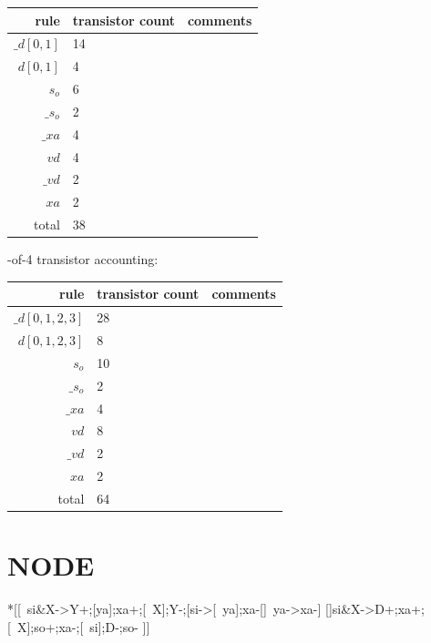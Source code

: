 \documentclass{article}
\begin{document}
\begin{center}
    \begin{tabular}{|r|l|l|}
    \hline
    rule & transistor count & comments \\ \hline
    $\_d[0,1]$ & 14 & \\ \hline
    $d[0,1]$ & 4 & \\ \hline
    $s_o$ & 6 & \\ \hline
    $\_s_o$ & 2 & \\ \hline
    $\_xa$ & 4 & \\ \hline
    $vd$ & 4 & \\ \hline
    $\_vd$ & 2 & \\ \hline
    $xa$ & 2 & \\ \hline
    \hline total & 38 & \\ \hline
    \end{tabular}
\end{center}

-of-4 transistor accounting:

\begin{center}
    \begin{tabular}{|r|l|l|}
    \hline
    rule & transistor count & comments \\ \hline
    $\_d[0,1,2,3]$ & 28 & \\ \hline
    $d[0,1,2,3]$ & 8 & \\ \hline
    $s_o$ & 10 & \\ \hline
    $\_s_o$ & 2 & \\ \hline
    $\_xa$ & 4 & \\ \hline
    $vd$ & 8 & \\ \hline
    $\_vd$ & 2 & \\ \hline
    $xa$ & 2 & \\ \hline
    \hline total & 64 & \\ \hline
    \end{tabular}
\end{center}

\section{NODE \label{sec:DESERIAL_CHAIN_NODE}}

\begin{hse}
*[[~si&X->Y+;[ya];xa+;[~X];Y-;[si->[~ya];xa-[]~ya->xa-]
  []si&X->D+;xa+;[~X];so+;xa-;[~si];D-;so-
 ]]
\end{hse}
\end{document}
